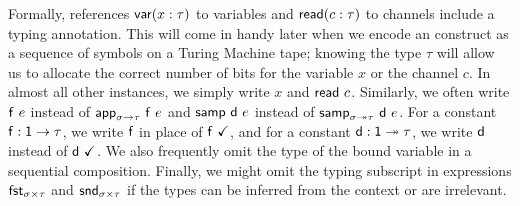 Formally, references $\mathsf{var}(x : \tau)$ to variables and $\mathsf{read}(c : \tau)$ to channels include a typing annotation. This will come in handy later when we encode an \ipdl construct as a sequence of symbols on a Turing Machine tape; knowing the type $\tau$ will allow us to allocate the correct number of bits for the variable $x$ or the channel $c$. In almost all other instances, we simply write $x$ and $\mathsf{read} \ c$. Similarly, we often write $\mathsf{f} \ e$ instead of $\mathsf{app}_{\sigma \to \tau} \ \mathsf{f} \ e$ and $\mathsf{samp} \ \mathsf{d} \ e$ instead of $\mathsf{samp}_{\sigma \twoheadrightarrow \tau} \ \mathsf{d} \ e$. For a constant $\mathsf{f} : \mathsf{1} \rightarrow \tau$, we write $\mathsf{f}$ in place of $\mathsf{f} \ \checkmark$, and for a constant $\mathsf{d} : \mathsf{1} \twoheadrightarrow \tau$, we write $\mathsf{d}$ instead of $\mathsf{d} \ \checkmark$. We also frequently omit the type of the bound variable in a sequential composition. Finally, we might omit the typing subscript in expressions $\mathsf{fst}_{\sigma \times \tau}$ and $\mathsf{snd}_{\sigma \times \tau}$ if the types can be inferred from the context or are irrelevant.




